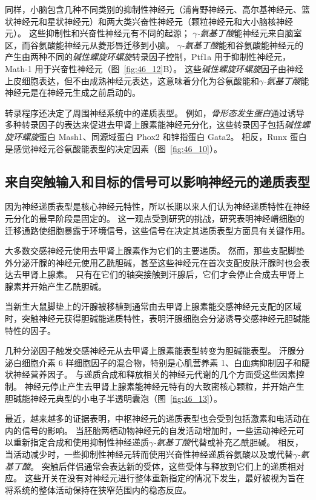 同样，小脑包含几种不同类别的抑制性神经元（浦肯野神经元、高尔基神经元、篮状神经元和星状神经元）和两大类兴奋性神经元（颗粒神经元和大小脑核神经元）。
这些抑制性和兴奋性神经元有不同的起源；
\textit{$\gamma$-氨基丁酸}能神经元来自脑室区，而谷氨酸能神经元从菱形唇迁移到小脑。
\textit{$\gamma$-氨基丁酸}能和谷氨酸能神经元的产生由两种不同的\textit{碱性螺旋环螺旋}转录因子控制，Ptf1a 用于抑制性神经元，Math-1 用于兴奋性神经元（图~\ref{fig:46_12}B）。
这些\textit{碱性螺旋环螺旋}因子由神经上皮细胞表达，但不由成熟神经元表达，这意味着分化为谷氨酸能和\textit{$\gamma$-氨基丁酸}能神经元是在神经元生成之前启动的。


转录程序还决定了周围神经系统中的递质表型。
例如，\textit{骨形态发生蛋白}通过诱导多种转录因子的表达来促进去甲肾上腺素能神经元分化，这些转录因子包括\textit{碱性螺旋环螺旋}蛋白 Mash1、同源域蛋白 Phox2 和锌指蛋白 Gata2。
相反，Runx 蛋白是感觉神经元谷氨酸能表型的决定因素（图~\ref{fig:46_10}）。



\subsection{来自突触输入和目标的信号可以影响神经元的递质表型}

因为神经递质表型是核心神经元特性，所以长期以来人们认为神经递质特性在神经元分化的最早阶段是固定的。
这一观点受到研究的挑战，研究表明神经嵴细胞的迁移通路使细胞暴露于环境信号，这些信号在决定其递质表型方面具有关键作用。


大多数交感神经元使用去甲肾上腺素作为它们的主要递质。
然而，那些支配脚垫外分泌汗腺的神经元使用乙酰胆碱，甚至这些神经元在首次支配皮肤汗腺时也会表达去甲肾上腺素。
只有在它们的轴突接触到汗腺后，它们才会停止合成去甲肾上腺素并开始产生乙酰胆碱。


当新生大鼠脚垫上的汗腺被移植到通常由去甲肾上腺素能交感神经元支配的区域时，突触神经元获得胆碱能递质特性，表明汗腺细胞会分泌诱导交感神经元胆碱能特性的因子。


几种分泌因子触发交感神经元从去甲肾上腺素能表型转变为胆碱能表型。
汗腺分泌白细胞介素 6 样细胞因子的混合物，特别是心肌营养素 1、白血病抑制因子和睫状神经营养因子。
与递质合成和释放相关的神经元代谢的几个方面受这些因素控制。
神经元停止产生去甲肾上腺素能神经元特有的大致密核心颗粒，并开始产生胆碱能神经元典型的小电子半透明囊泡（图~\ref{fig:46_13}）。


最近，越来越多的证据表明，中枢神经元的递质表型也会受到包括激素和电活动在内的信号的影响。
当胚胎两栖动物神经元的自发活动增加时，一些运动神经元可以重新指定合成和使用抑制性神经递质\textit{$\gamma$-氨基丁酸}代替或补充乙酰胆碱。
相反，当活动减少时，一些抑制性神经元转而使用兴奋性神经递质谷氨酸以及或代替\textit{$\gamma$-氨基丁酸}。
突触后伴侣通常会表达新的受体，这些受体与释放到它们上的递质相对应。
这些开关在没有对神经元进行整体重新指定的情况下发生，最好被视为旨在将系统的整体活动保持在狭窄范围内的稳态反应。


